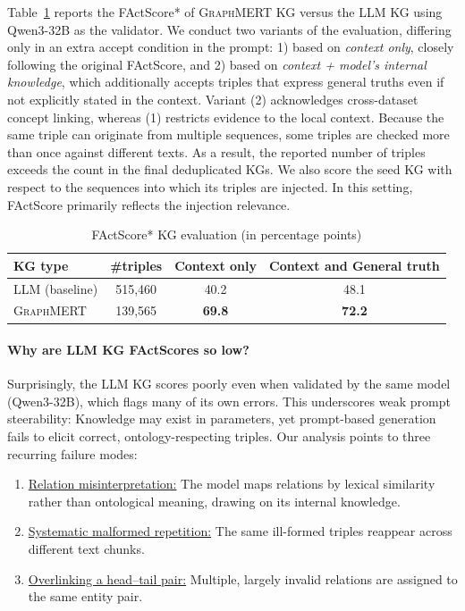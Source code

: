 \documentclass[10pt]{article}
\newcommand{\ours}{\textsc{GraphMERT}\xspace}
\begin{document}
Table~\ref{tab:factscore} reports the FActScore* of \ours KG versus the LLM KG using Qwen3-32B as the validator. We conduct two variants of the evaluation, differing only in an extra accept condition in the prompt:  
1) based on \emph{context only}, closely following the original FActScore, and  
2) based on \emph{context + model’s internal knowledge}, which additionally accepts triples that express general truths even if not explicitly stated in the context.  
Variant (2) acknowledges cross-dataset concept linking, whereas (1) restricts evidence to the local context. Because the same triple can originate from multiple sequences, some triples are checked more than once against different texts. As a result, the reported number of triples exceeds the count in the final deduplicated KGs.
We also score the seed KG with respect to the sequences into which its triples are injected. In this setting, FActScore primarily reflects the injection relevance.

\begin{table}[t]
  \centering
  \caption{FActScore* KG evaluation (in percentage points)}
  \label{tab:factscore}
  \small
  \setlength{\tabcolsep}{6pt}
  \begin{tabular}{l c c c}
    \toprule
    \rowcolor{gray!30}
    \textbf{KG type} &
    \textbf{\#triples} &
    \textbf{Context only} &
    \textbf{Context and General truth} \\
    \midrule
    LLM (baseline) & 515,460 & 40.2 & 48.1 \\
    \ours & 139,565 & \textbf{69.8} & \textbf{72.2} \\   
    \bottomrule
  \end{tabular}
\end{table}

\paragraph{Why are LLM KG FActScores so low?}
Surprisingly, the LLM KG scores poorly even when validated by the same model (Qwen3-32B), which flags many of its own errors. This underscores weak prompt steerability: Knowledge may exist in parameters, yet prompt-based generation fails to elicit correct, ontology-respecting triples.
Our analysis points to three recurring failure modes:
\begin{enumerate}
  \item \underline{Relation misinterpretation:} The model maps relations by lexical similarity rather than ontological meaning, drawing on its internal knowledge.
  \item \underline{Systematic malformed repetition:} The same ill-formed triples reappear across different text chunks.
  \item \underline{Overlinking a head–tail pair:} Multiple, largely invalid relations are assigned to the same entity pair.
\end{enumerate}
\end{document}
